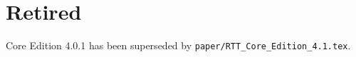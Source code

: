 \documentclass[11pt]{article}
\begin{document}
\section*{Retired}
Core Edition 4.0.1 has been superseded by
\texttt{paper/RTT\_Core\_Edition\_4.1.tex}.
\end{document}
